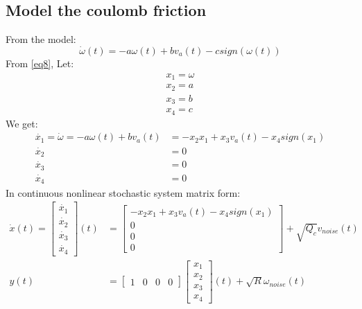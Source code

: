 \documentclass[12pt,a4paper]{article}
\begin{document}
	\subsection{Model the coulomb friction}
	From the model:
	\begin{equation}
		\dot{\omega}(t) = - a \omega(t) + b v_a(t) - csign(\omega(t))
		\label{eq8}
	\end{equation}
	From \autoref{eq8}, Let:
	\begin{equation}
		\begin{split}
			x_1 = \omega\\
			x_2 = a\\
			x_3 = b\\
			x_4 = c
		\end{split}
		\label{eq9}
	\end{equation}
	We get:
	\begin{equation}
		\begin{split}
			\dot{x_1} = \dot{\omega} = - a \omega(t) + b v_a(t) &= -x_2 x_1 + x_3 v_a(t) - x_4sign(x_1)  \\
			\dot{x_2} &= 0 \\
			\dot{x_3} &= 0 \\
			\dot{x_4} &= 0
		\end{split}
		\label{eq10}
	\end{equation}
	In continuous nonlinear stochastic system matrix form:
	\begin{equation}
		\boxed{\begin{split}
				\dot{x}(t) =
				\begin{bmatrix}
					\dot{x_1} \\
					\dot{x_2} \\
					\dot{x_3} \\
					\dot{x_4} 
				\end{bmatrix}(t) &=
				\begin{bmatrix}
					-x_2 x_1 + x_3 v_a(t) - x_4sign(x_1) \\
					0                                    \\
					0                                    \\
					0                                    
				\end{bmatrix} +\sqrt{Q_c}v_{noise}(t)\\
				y(t) &= 
				\begin{bmatrix}
					1 & 0 & 0 & 0 
				\end{bmatrix}
				\begin{bmatrix}
					x_1 \\
					x_2 \\
					x_3 \\
					x_4 
				\end{bmatrix}(t)+\sqrt{R}\omega_{noise}(t)
		\end{split}}
		\label{eq11}
	\end{equation}
\end{document}
